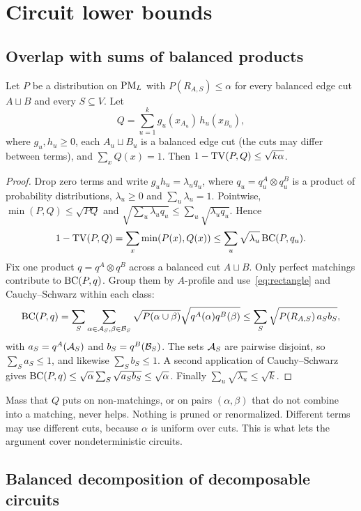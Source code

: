 \section{Circuit lower bounds}\label{sec:circuits}

\subsection{Overlap with sums of balanced products}

\begin{lemma}[overlap]\label{lem:overlap}
Let $P$ be a distribution on $\mathrm{PM}_L$ with $P(R_{A,S})\le\alpha$ for every balanced edge cut $A\sqcup B$ and every $S\subseteq V$. Let
\[
  Q=\sum_{u=1}^kg_u(x_{A_u})\,h_u(x_{B_u}),
\]
where $g_u,h_u\ge0$, each $A_u\sqcup B_u$ is a balanced edge cut (the cuts may differ between terms), and $\sum_xQ(x)=1$. Then $1-\mathrm{TV}(P,Q)\le\sqrt{k\alpha}$.
\end{lemma}

\begin{proof}
Drop zero terms and write $g_uh_u=\lambda_uq_u$, where $q_u=q_u^A\otimes q_u^B$ is a product of probability distributions, $\lambda_u\ge0$ and $\sum_u\lambda_u=1$. Pointwise, $\min(P,Q)\le\sqrt{PQ}$ and $\sqrt{\sum_u\lambda_uq_u}\le\sum_u\sqrt{\lambda_uq_u}$. Hence
\[
  1-\mathrm{TV}(P,Q)=\sum_x\min(P(x),Q(x))\le\sum_u\sqrt{\lambda_u}\,\mathrm{BC}(P,q_u).
\]
Fix one product $q=q^A\otimes q^B$ across a balanced cut $A\sqcup B$. Only perfect matchings contribute to $\mathrm{BC}(P,q)$. Group them by $A$-profile and use~\eqref{eq:rectangle} and Cauchy--Schwarz within each class:
\[
  \mathrm{BC}(P,q)=\sum_S\sum_{\alpha\in\mathcal{A}_S,\beta\in\mathcal{B}_S}\sqrt{P(\alpha\cup\beta)}\sqrt{q^A(\alpha)q^B(\beta)}\le\sum_S\sqrt{P(R_{A,S})\,a_Sb_S},
\]
with $a_S=q^A(\mathcal{A}_S)$ and $b_S=q^B(\mathcal{B}_S)$. The sets $\mathcal{A}_S$ are pairwise disjoint, so $\sum_Sa_S\le1$, and likewise $\sum_Sb_S\le1$. A second application of Cauchy--Schwarz gives $\mathrm{BC}(P,q)\le\sqrt\alpha\sum_S\sqrt{a_Sb_S}\le\sqrt\alpha$. Finally $\sum_u\sqrt{\lambda_u}\le\sqrt k$.
\end{proof}

Mass that $Q$ puts on non-matchings, or on pairs $(\alpha,\beta)$ that do not combine into a matching, never helps. Nothing is pruned or renormalized. Different terms may use different cuts, because $\alpha$ is uniform over cuts. This is what lets the argument cover nondeterministic circuits.

\subsection{Balanced decomposition of decomposable circuits}

